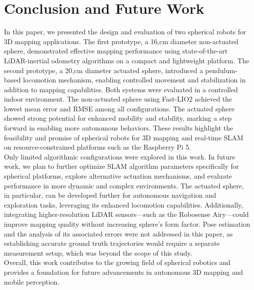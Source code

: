 \documentclass[conference]{IEEEtran}
\begin{document}
\section*{Conclusion and Future Work}
In this paper, we presented the design and evaluation of two spherical robots for 3D mapping applications. The first prototype, a 16,cm diameter non-actuated sphere, demonstrated effective mapping performance using state-of-the-art LiDAR-inertial odometry algorithms on a compact and lightweight platform. The second prototype, a 20,cm diameter actuated sphere, introduced a pendulum-based locomotion mechanism, enabling controlled movement and stabilization in addition to mapping capabilities. Both systems were evaluated in a controlled indoor environment. The non-actuated sphere using Fast-LIO2 achieved the lowest mean error and RMSE among all configurations. The actuated sphere showed strong potential for enhanced mobility and stability, marking a step forward in enabling more autonomous behaviors. These results highlight the feasibility and promise of spherical robots for 3D mapping and real-time SLAM on resource-constrained platforms such as the Raspberry Pi 5.\\
\hspace*{1em}Only limited algorithmic configurations were explored in this work. In future work, we plan to further optimize SLAM algorithm parameters specifically for spherical platforms, explore alternative actuation mechanisms, and evaluate performance in more dynamic and complex environments. The actuated sphere, in particular, can be developed further for autonomous navigation and exploration tasks, leveraging its enhanced locomotion capabilities. Additionally, integrating higher-resolution LiDAR sensors—such as the Robosense Airy—could improve mapping quality without increasing sphere's form factor. Pose estimation and the analysis of its associated errors were not addressed in this paper, as establishing accurate ground truth trajectories would require a separate measurement setup, which was beyond the scope of this study.\\
\hspace*{1em}Overall, this work contributes to the growing field of spherical robotics and provides a foundation for future advancements in autonomous 3D mapping and mobile perception.



\vspace{12pt}
\end{document}
